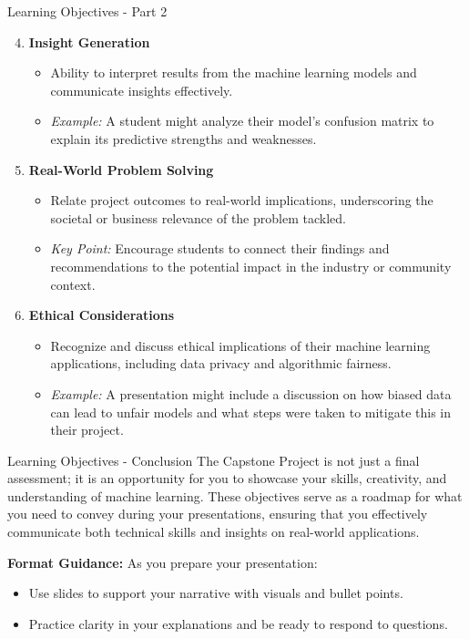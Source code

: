 \documentclass[aspectratio=169]{beamer}
\begin{document}
\begin{frame}[fragile]{Learning Objectives - Part 2}
    \begin{enumerate}
        \setcounter{enumi}{3} %
        \item \textbf{Insight Generation}
        \begin{itemize}
            \item Ability to interpret results from the machine learning models and communicate insights effectively.
            \item \textit{Example:} A student might analyze their model's confusion matrix to explain its predictive strengths and weaknesses.
        \end{itemize}

        \item \textbf{Real-World Problem Solving}
        \begin{itemize}
            \item Relate project outcomes to real-world implications, underscoring the societal or business relevance of the problem tackled.
            \item \textit{Key Point:} Encourage students to connect their findings and recommendations to the potential impact in the industry or community context.
        \end{itemize}

        \item \textbf{Ethical Considerations}
        \begin{itemize}
            \item Recognize and discuss ethical implications of their machine learning applications, including data privacy and algorithmic fairness.
            \item \textit{Example:} A presentation might include a discussion on how biased data can lead to unfair models and what steps were taken to mitigate this in their project.
        \end{itemize}
    \end{enumerate}
\end{frame}

\begin{frame}[fragile]{Learning Objectives - Conclusion}
    The Capstone Project is not just a final assessment; it is an opportunity for you to showcase your skills, creativity, and understanding of machine learning. These objectives serve as a roadmap for what you need to convey during your presentations, ensuring that you effectively communicate both technical skills and insights on real-world applications.

    \textbf{Format Guidance:} As you prepare your presentation:
    \begin{itemize}
        \item Use slides to support your narrative with visuals and bullet points.
        \item Practice clarity in your explanations and be ready to respond to questions.
    \end{itemize}
\end{frame}
\end{document}
